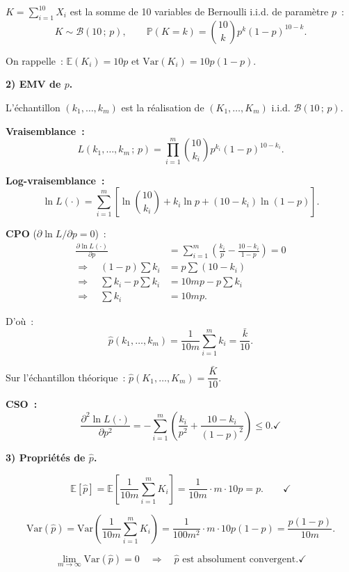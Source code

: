 \documentclass[11pt,a4paper]{article}
\newcommand{\B}{\mathcal{B}}
\newcommand{\E}{\mathbb{E}}
\newcommand{\Var}{\mathrm{Var}}
\newcommand{\Prob}{\mathbb{P}}
\renewcommand{\P}{\Prob}
\begin{document}
$K=\sum_{i=1}^{10}X_i$ est la somme de 10 variables de Bernoulli i.i.d. de param\`etre $p$~:
$$K \sim \B(10\,;\,p), \qquad \P(K=k)=\binom{10}{k}p^k(1-p)^{10-k}.$$

On rappelle~: $\E(K_i)=10p$ et $\Var(K_i)=10p(1-p)$.

\medskip
\textbf{2) EMV de $p$.}

L'\'echantillon $(k_1,\ldots,k_m)$ est la r\'ealisation de $(K_1,\ldots,K_m)$ i.i.d. $\B(10\,;\,p)$.

\textbf{Vraisemblance~:}
$$L(k_1,\ldots,k_m\,;\,p) = \prod_{i=1}^m\binom{10}{k_i}p^{k_i}(1-p)^{10-k_i}.$$

\textbf{Log-vraisemblance~:}
$$\ln L(\cdot) = \sum_{i=1}^m\left[\ln\binom{10}{k_i} + k_i\ln p + (10-k_i)\ln(1-p)\right].$$

\textbf{CPO} ($\partial\ln L/\partial p = 0$)~:
\begin{align*}
\frac{\partial\ln L(\cdot)}{\partial p} &= \sum_{i=1}^m\left(\frac{k_i}{p}-\frac{10-k_i}{1-p}\right) = 0 \\[4pt]
\Rightarrow\quad (1-p)\sum k_i &= p\sum(10-k_i) \\
\Rightarrow\quad \sum k_i - p\sum k_i &= 10mp - p\sum k_i \\
\Rightarrow\quad \sum k_i &= 10mp.
\end{align*}

D'o\`u~:
$$\boxed{\hat p(k_1,\ldots,k_m) = \frac{1}{10m}\sum_{i=1}^m k_i = \frac{\bar k}{10}.}$$

Sur l'\'echantillon th\'eorique~: $\hat p(K_1,\ldots,K_m) = \dfrac{\bar K}{10}$.

\textbf{CSO~:}
$$\frac{\partial^2\ln L(\cdot)}{\partial p^2}
  = -\sum_{i=1}^m\!\left(\frac{k_i}{p^2}+\frac{10-k_i}{(1-p)^2}\right) \leq 0. \checkmark$$

\medskip
\textbf{3) Propri\'et\'es de $\hat p$.}

\begin{demobox}
$$\E[\hat p] = \E\!\left[\frac{1}{10m}\sum_{i=1}^m K_i\right]
  = \frac{1}{10m}\cdot m\cdot 10p = p. \qquad\checkmark$$
\end{demobox}

\begin{demobox}[(b) Convergence]
$$\Var(\hat p) = \Var\!\left(\frac{1}{10m}\sum_{i=1}^m K_i\right)
  = \frac{1}{100m^2}\cdot m\cdot 10p(1-p) = \frac{p(1-p)}{10m}.$$

$$\lim_{m\to\infty}\Var(\hat p) = 0 \quad\Rightarrow\quad \hat p \text{ est absolument convergent.} \checkmark$$
\end{demobox}
\end{document}
